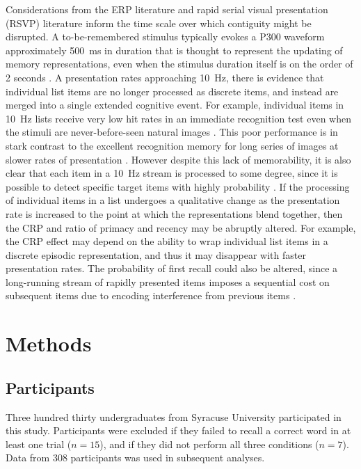 \documentclass[10pt,letterpaper]{article}
\begin{document}
Considerations from the ERP literature and rapid serial visual presentation
(RSVP) literature inform the time scale over which contiguity might be
disrupted.  A to-be-remembered stimulus typically evokes a P300 waveform
approximately 500~ms in duration that is thought to represent the updating of
memory representations, even when the stimulus duration itself is on the order
of 2 seconds \cite{Donc81}.
A presentation rates approaching 10~Hz, there is evidence that individual list
items are no longer processed as discrete items, and instead are merged into a
single extended cognitive event.  For example, individual items in 10~Hz lists
receive very low hit rates in an immediate recognition test even when the
stimuli are never-before-seen natural images \cite{PottLevy69}.  This poor
performance is in stark contrast to the excellent recognition memory for long
series of images  at slower rates of presentation \cite{Stan73,BradEtal08}.
However despite this lack of memorability, it is also clear that each item in
a 10~Hz stream is processed to some degree, since
it is possible to detect specific target items with highly probability
\cite{Pott76}.  If the processing of individual items in a list undergoes a
qualitative change as the presentation rate is increased to the point at which
the representations blend together, then the CRP and ratio of primacy and
recency may be abruptly altered. For example, the CRP effect may depend
on the ability to wrap individual list items in a discrete episodic
representation, and thus it may disappear with faster presentation rates. The
probability of first recall could also be altered, since a long-running stream of
rapidly presented items imposes a sequential cost on subsequent items due to
encoding interference from previous items \cite{WyblEtal09}.  


\section{Methods}

\subsection{Participants}

Three hundred thirty undergraduates from Syracuse University participated in
this study.  
Participants were excluded if they failed to recall a correct word in at least
one trial ($n = 15$), and if they did not perform all three conditions ($n =
7$). Data from 308 participants was used in subsequent analyses.  
\end{document}
